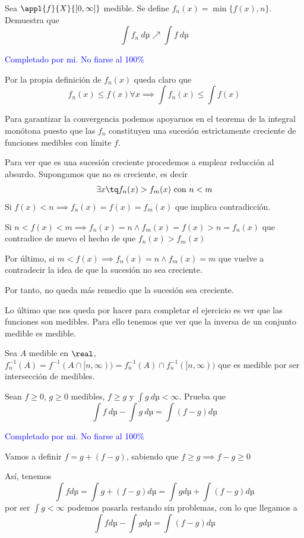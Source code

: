 \begin{problem}[7]
Sea $\appl{f}{X}{[0,\infty]}$ medible. Se define $f_n(x)=\min\{f(x), n\}$. Demuestra que
\[\int f_n \ dµ \nearrow \int f \ dµ\]

\solution
\textcolor{blue}{Completado por mi. No fiarse al 100\%}

Por la propia definición de $f_n(x)$ queda claro que
\[f_n(x) \leq f(x) \forall x \implies \int f_n(x) \leq \int f(x)\]

Para garantizar la convergencia podemos apoyarnos en el teorema de la integral monótona puesto que las $f_n$ constituyen una sucesión estrictamente creciente de funciones medibles con límite $f$.

Para ver que es una sucesión creciente procedemos a emplear reducción al absurdo. Supongamos que no es creciente, es decir
\[\exists x \tq f_n(x)>f_m(x) \text{ con } n<m\]
Si $f(x)<n \implies f_n(x)=f(x)=f_m(x)$ que implica contradicción.

Si $n<f(x)<m \implies f_n(x)=n \wedge f_m(x)=f(x)>n=f_n(x)$ que contradice de nuevo el hecho de que $f_n(x)>f_m(x)$

Por último, si $m<f(x) \implies f_n(x)=n \wedge f_m(x)=m$ que vuelve a contradecir la idea de que la sucesión no sea creciente.

Por tanto, no queda más remedio que la sucesión sea creciente.

Lo último que nos queda por hacer para completar el ejercicio es ver que las funciones son medibles. Para ello tenemos que ver que la inversa de un conjunto medible es medible.

Sea $A$ medible en $\real$, $f_n^{-1}(A)=f^{-1}(A \cap [n,\infty)) = f_n^{-1}(A)\cap f_n^{-1}([n,\infty))$ que es medible por ser intersección de medibles.


\end{problem}

\begin{problem}[8]
Sean $f\geq 0$, $g\geq 0$ medibles, $f\geq g$ y $\int g \ dµ < \infty$. Prueba que
\[\int f \ dµ - \int g \ dµ = \int (f-g)dµ\]

\solution
\textcolor{blue}{Completado por mi. No fiarse al 100\%}

Vamos a definir $f=g+(f-g)$, sabiendo que $f\geq g \implies f-g\geq 0$

Así, tenemos
\[\int f dµ = \int g+(f-g)dµ = \int gdµ + \int (f-g) dµ\]
por ser $\int g < \infty$ podemos pasarla restando sin problemas, con lo que llegamos a
\[\int f dµ - \int gdµ = \int (f-g) dµ\]

\end{problem}

